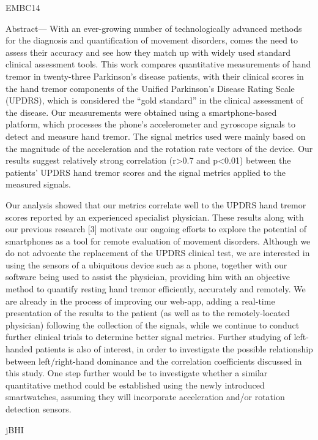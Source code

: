 EMBC14

Abstract— With an ever-growing number of technologically advanced methods for the diagnosis and quantification of movement disorders, comes the need to assess their accuracy and see how they match up with widely used standard clinical assessment tools. This work compares quantitative measurements of hand tremor in twenty-three Parkinson’s disease patients, with their clinical scores in the hand tremor components of the Unified Parkinson’s Disease Rating Scale (UPDRS), which is considered the “gold standard” in the clinical assessment of the disease. Our measurements were obtained using a smartphone-based platform, which processes the phone’s accelerometer and gyroscope signals to detect and measure hand tremor. The signal metrics used were mainly based on the magnitude of the acceleration and the rotation rate vectors of the device. Our results suggest relatively strong correlation (r>0.7 and p<0.01) between the patients’ UPDRS hand tremor scores and the signal metrics applied to the measured signals. 

Our analysis showed that our metrics correlate well to the UPDRS hand tremor scores reported by an experienced specialist physician. These results along with our previous research [3] motivate our ongoing efforts to explore the potential of smartphones as a tool for remote evaluation of movement disorders. Although we do not advocate the replacement of the UPDRS clinical test, we are interested in using the sensors of a ubiquitous device such as a phone, together with our software being used to assist the physician, providing him with an objective method to quantify resting hand tremor efficiently, accurately and remotely. We are already in the process of improving our web-app, adding a real-time presentation of the results to the patient (as well as to the remotely-located physician) following the collection of the signals, while we continue to conduct further clinical trials to determine better signal metrics. Further studying of left-handed patients is also of interest, in order to investigate the possible relationship between left/right-hand dominance and the correlation coefficients discussed in this study. One step further would be to investigate whether a similar quantitative method could be established using the newly introduced smartwatches, assuming they will incorporate acceleration and/or rotation detection sensors. 

jBHI

